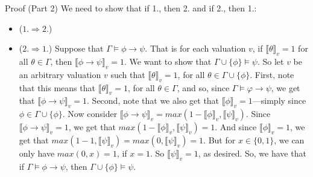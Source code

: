 \begin{frame}{Proof (Part 2)}
We need to show that if 1., then 2. and if 2., then 1.:
			
			\begin{itemize}
			
				\item ($1.\Rightarrow 2.$) \checkmark
				
				\item ($2.\Rightarrow 1.$) Suppose that $\Gamma\vDash\phi\to\psi$. That is for each valuation $v$, if $\llbracket\theta\rrbracket_v=1$ for all $\theta\in\Gamma$, then $\llbracket\phi\to\psi\rrbracket_v=1$. We want to show that $\Gamma\cup\{\phi\}\vDash\psi$. So let $v$ be an arbitrary valuation $v$ such that $\llbracket\theta\rrbracket_v=1$, for all $\theta\in \Gamma\cup\{\phi\}$. First, note that this means that $\llbracket\theta\rrbracket_v=1$, for all $\theta\in \Gamma$, and so, since $\Gamma\vDash\varphi\to\psi$, we get that $\llbracket\phi\to\psi\rrbracket_v=1$. Second, note that we also get that $\llbracket\phi\rrbracket_v=1$---simply since $\phi\in\Gamma\cup\{\phi\}$. Now consider $\llbracket\phi\to\psi\rrbracket_v=max(1-\llbracket\phi\rrbracket_v,\llbracket\psi\rrbracket_v)$. Since $\llbracket\phi\to\psi\rrbracket_v=1$, we get that $max(1-\llbracket\phi\rrbracket_v,\llbracket\psi\rrbracket_v)=1$. And since $\llbracket\phi\rrbracket_v=1$, we get that $max(1-1,\llbracket\psi\rrbracket_v)=max(0,\llbracket\psi\rrbracket_v)=1$. But for $x\in\{0,1\}$, we can only have $max(0,x)=1$, if $x=1$. So $\llbracket\psi\rrbracket_v=1$, as desired. So, we have that if $\Gamma\vDash\phi\to\psi$, then $\Gamma\cup\{\phi\}\vDash\psi$.

\end{itemize}

\end{frame}

